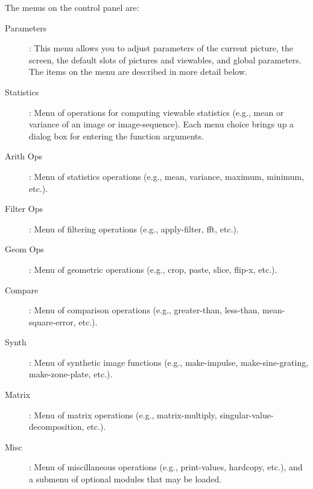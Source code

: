 The menus on the control panel are:
\begin{description}

\item [Parameters]: This menu allows you to adjust parameters of the
current picture, the screen, the default slots of pictures and
viewables, and global parameters.  The items on the menu are described
in more detail below.

\item [Statistics]: Menu of operations for computing viewable
statistics (e.g., mean or variance of an image or image-sequence).
Each menu choice brings up a dialog box for entering the function
arguments.

\item [Arith Ops]: Menu of statistics operations (e.g., mean,
variance, maximum, minimum, etc.).

\item [Filter Ops]: Menu of filtering operations (e.g., apply-filter,
fft, etc.).

\item [Geom Ops]: Menu of geometric operations (e.g., crop, paste,
slice, flip-x, etc.).

\item [Compare]: Menu of comparison operations (e.g., greater-than,
less-than, mean-square-error, etc.).

\item [Synth]: Menu of synthetic image functions (e.g., make-impulse,
make-sine-grating, make-zone-plate, etc.).

\item [Matrix]: Menu of matrix operations (e.g., matrix-multiply,
singular-value-decomposition, etc.).

\item [Misc]: Menu of miscillaneous operations (e.g., print-values,
hardcopy, etc.), and a submenu of optional modules that may be loaded.
\end{description}

